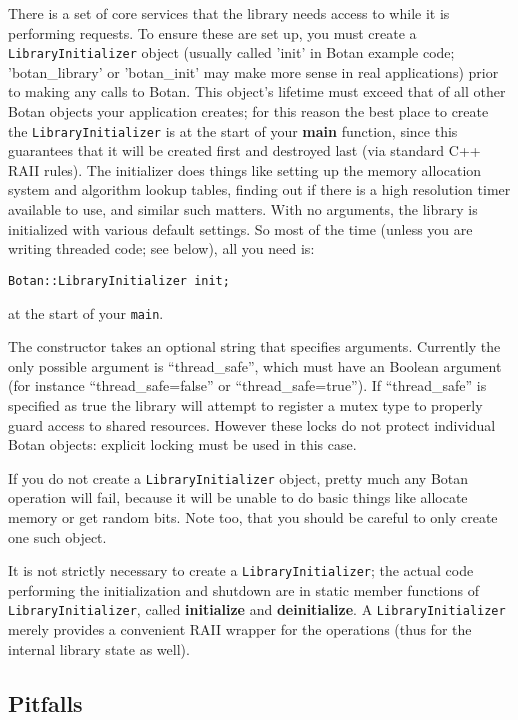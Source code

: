 \documentclass{article}
\newcommand{\function}[1]{\textbf{#1}}
\newcommand{\type}[1]{\texttt{#1}}
\begin{document}
There is a set of core services that the library needs access to
while it is performing requests. To ensure these are set up, you must
create a \type{LibraryInitializer} object (usually called 'init' in
Botan example code; 'botan\_library' or 'botan\_init' may make more
sense in real applications) prior to making any calls to Botan. This
object's lifetime must exceed that of all other Botan objects your
application creates; for this reason the best place to create the
\type{LibraryInitializer} is at the start of your \function{main}
function, since this guarantees that it will be created first and
destroyed last (via standard C++ RAII rules). The initializer does
things like setting up the memory allocation system and algorithm
lookup tables, finding out if there is a high resolution timer
available to use, and similar such matters. With no arguments, the
library is initialized with various default settings. So most of the
time (unless you are writing threaded code; see below), all you need
is:

\texttt{Botan::LibraryInitializer init;}

at the start of your \texttt{main}.

The constructor takes an optional string that specifies arguments.
Currently the only possible argument is ``thread\_safe'', which must
have an Boolean argument (for instance ``thread\_safe=false'' or
``thread\_safe=true''). If ``thread\_safe'' is specified as true the
library will attempt to register a mutex type to properly guard access
to shared resources. However these locks do not protect individual
Botan objects: explicit locking must be used in this case.

If you do not create a \type{LibraryInitializer} object, pretty much
any Botan operation will fail, because it will be unable to do basic
things like allocate memory or get random bits. Note too, that you
should be careful to only create one such object.

It is not strictly necessary to create a \type{LibraryInitializer};
the actual code performing the initialization and shutdown are in
static member functions of \type{LibraryInitializer}, called
\function{initialize} and \function{deinitialize}. A
\type{LibraryInitializer} merely provides a convenient RAII wrapper
for the operations (thus for the internal library state as well).

\subsection{Pitfalls}
\end{document}

